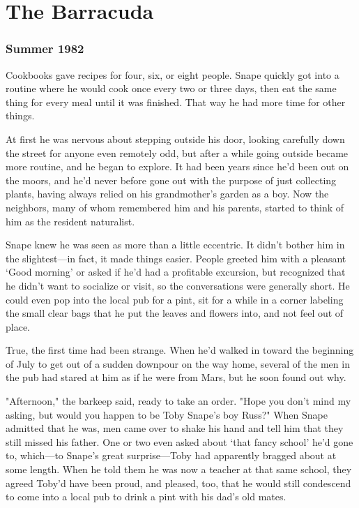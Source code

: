 
\chapter{The Barracuda}

\subsection{Summer 1982}

Cookbooks gave recipes for four, six, or eight people. Snape quickly got into a routine where he would cook once every two or three days, then eat the same thing for every meal until it was finished. That way he had more time for other things.

At first he was nervous about stepping outside his door, looking carefully down the street for anyone even remotely odd, but after a while going outside became more routine, and he began to explore. It had been years since he'd been out on the moors, and he'd never before gone out with the purpose of just collecting plants, having always relied on his grandmother's garden as a boy. Now the neighbors, many of whom remembered him and his parents, started to think of him as the resident naturalist.

Snape knew he was seen as more than a little eccentric. It didn't bother him in the slightest—in fact, it made things easier. People greeted him with a pleasant `Good morning' or asked if he'd had a profitable excursion, but recognized that he didn't want to socialize or visit, so the conversations were generally short. He could even pop into the local pub for a pint, sit for a while in a corner labeling the small clear bags that he put the leaves and flowers into, and not feel out of place.

True, the first time had been strange. When he'd walked in toward the beginning of July to get out of a sudden downpour on the way home, several of the men in the pub had stared at him as if he were from Mars, but he soon found out why.

"Afternoon," the barkeep said, ready to take an order. "Hope you don't mind my asking, but would you happen to be Toby Snape's boy Russ?" When Snape admitted that he was, men came over to shake his hand and tell him that they still missed his father. One or two even asked about `that fancy school' he'd gone to, which—to Snape's great surprise—Toby had apparently bragged about at some length. When he told them he was now a teacher at that same school, they agreed Toby'd have been proud, and pleased, too, that he would still condescend to come into a local pub to drink a pint with his dad's old mates.

